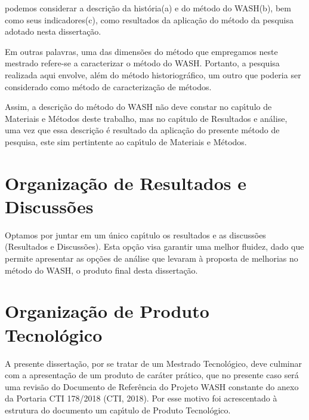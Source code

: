 \documentclass[
12pt,		%
openright,	%
twoside,  %
a4paper,			%
chapter=TITLE,		%
english,			%
french,				%
spanish,			%
brazil				%
]{USPSC-classe/USPSC_RedarTex}
\begin{document}
podemos considerar a descri\c{c}\~ao da hist\'oria(a) e do m\'etodo do WASH(b), bem como seus indicadores(c), como resultados da aplica\c{c}\~ao do m\'etodo da pesquisa adotado nesta disserta\c{c}\~ao.








Em outras palavras, uma das dimens\~oes do m\'etodo que empregamos neste mestrado refere-se a caracterizar o m\'etodo do WASH. Portanto, a pesquisa realizada aqui envolve, al\'em do m\'etodo historiogr\'afico, um outro que poderia ser considerado como m\'etodo de caracteriza\c{c}\~ao de m\'etodos.








Assim, a descri\c{c}\~ao do m\'etodo do WASH n\~ao deve constar no cap\'{\i}tulo de Materiais e M\'etodos deste trabalho, mas no cap\'{\i}tulo de Resultados e an\'alise, uma vez que essa descri\c{c}\~ao \'e resultado da aplica\c{c}\~ao do presente m\'etodo de pesquisa, este sim pertintente ao cap\'{\i}tulo de \textquotedbl Materiais e M\'etodos\textquotedbl .








\section[Organiza\c{c}\~ao de Resultados e Discuss\~oes]{Organiza\c{c}\~ao de Resultados e Discuss\~oes}\label{Organiza\c{c}\~ao de Resultados e Discuss\~oes}
Optamos por juntar em um \'unico cap\'{\i}tulo os resultados e as discuss\~oes (\textquotedbl Resultados e Discuss\~oes\textquotedbl ). Esta op\c{c}\~ao visa garantir uma melhor fluidez, dado que permite apresentar as op\c{c}\~oes de an\'alise que levaram \`a proposta de melhorias no m\'etodo do WASH, o produto final desta disserta\c{c}\~ao.








\section[Organiza\c{c}\~ao de Produto Tecnol\'ogico]{Organiza\c{c}\~ao de Produto Tecnol\'ogico}\label{Organiza\c{c}\~ao de Produto Tecnol\'ogico}
A presente disserta\c{c}\~ao, por se tratar de um Mestrado Tecnol\'ogico, deve culminar com a apresenta\c{c}\~ao de um \textquotedbl produto de car\'ater pr\'atico\textquotedbl , que no presente caso ser\'a uma revis\~ao do Documento de Refer\^encia do Projeto WASH  constante do anexo da  Portaria CTI 178/2018 (CTI, 2018). Por esse motivo foi acrescentado \`a estrutura do documento um cap\'{\i}tulo de \textquotedbl Produto Tecnol\'ogico\textquotedbl .
\end{document}
